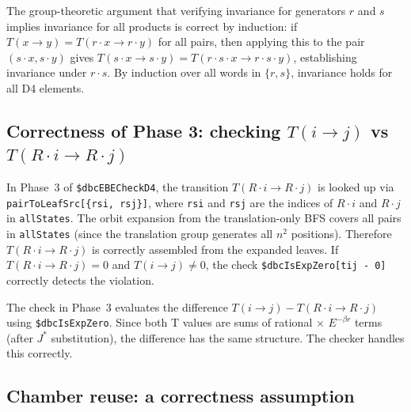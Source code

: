 \documentclass[12pt,a4paper]{article}
\theoremstyle{critical}
\theoremstyle{remark}
\theoremstyle{verified}
\begin{document}
The group-theoretic argument that verifying invariance for generators $r$ and $s$
implies invariance for all products is correct by induction: if $T(x\to y) =
T(r\cdot x\to r\cdot y)$ for all pairs, then applying this to the pair
$(s\cdot x, s\cdot y)$ gives $T(s\cdot x\to s\cdot y) = T(r\cdot s\cdot x\to
r\cdot s\cdot y)$, establishing invariance under $r\cdot s$.  By induction over
all words in $\{r, s\}$, invariance holds for all D4 elements.

\subsection{Correctness of Phase 3: checking $T(i\to j)$ vs $T(R\cdot i\to R\cdot j)$}

In Phase~3 of \texttt{\$dbcEBECheckD4}, the transition $T(R\cdot i\to R\cdot j)$
is looked up via \texttt{pairToLeafSrc[\{rsi, rsj\}]}, where \texttt{rsi} and
\texttt{rsj} are the indices of $R\cdot i$ and $R\cdot j$ in \texttt{allStates}.
The orbit expansion from the translation-only BFS covers all pairs in
\texttt{allStates} (since the translation group generates all $n^2$ positions).
Therefore $T(R\cdot i\to R\cdot j)$ is correctly assembled from the expanded
leaves.  If $T(R\cdot i\to R\cdot j) = 0$ and $T(i\to j) \neq 0$, the check
\texttt{\$dbcIsExpZero[tij - 0]} correctly detects the violation.

The check in Phase~3 evaluates the difference $T(i\to j) - T(R\cdot i\to
R\cdot j)$ using \texttt{\$dbcIsExpZero}.  Since both T values are sums of
rational $\times$ $E^{-\beta r}$ terms (after $J^\ast$ substitution), the
difference has the same structure.  The checker handles this correctly.

\subsection{Chamber reuse: a correctness assumption}
\label{sec:chamberreuse}
\end{document}
